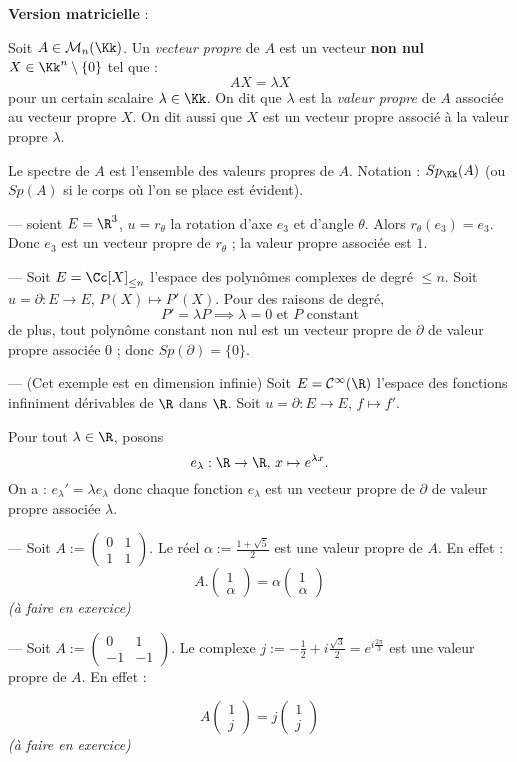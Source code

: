 \documentclass[class=report,crop=false]{standalone}
\newcommand{\exoo}{\emph{(à faire en exercice)}}
\newcommand{\Sp}{Sp}
\begin{document}
{\bf Version matricielle} :

Soit $A \in \mathcal{M}_n(\Kk)$.  Un {\it vecteur propre} de $A$ est un vecteur {\bf non nul}  $X \in \Kk^n\setminus\{0\}$ tel que :
\[A X = \lambda X\]
pour un certain scalaire $\lambda \in \Kk$. On dit que $\lambda$ est la {\it valeur propre} de $A$ associée au vecteur propre $X$. On dit aussi que $X$ est un vecteur propre associé à la valeur propre $\lambda$.

Le spectre de $A$ est l'ensemble des valeurs propres de $A$. Notation : $\Sp_\Kk(A)$ (ou $\Sp(A)$ si le corps où l'on se place est évident). 

\vskip 1cm
\begin{exemple}[s]

--- soient $E= \R^3$, $u=r_\theta$ la rotation d'axe $e_3$ et d'angle $\theta$. Alors $r_\theta(e_3)=e_3$. Donc $e_3$ est un vecteur propre de $r_\theta$ ; la valeur propre associée est $1$.

--- Soit $E=\Cc[X]_{\le n}$ l'espace des polynômes complexes de degré $\le n$. Soit $u=\partial : E \to E$, $P(X) \mapsto P'(X)$. Pour des raisons de degré, \[P' =\lambda P \implies \lambda =0 \text{ et } P \mbox{ constant}\]
de plus, tout polynôme constant non nul est un vecteur propre de $\partial$ de valeur propre associée $0$ ; donc $\Sp(\partial) = \{0\}$.

--- (Cet exemple est en dimension infinie) Soit $E =\mathcal{C}^\infty(\R)$ l'espace des fonctions infiniment dérivables de $\R$ dans $\R$. Soit $u =\partial 
 : E \to E$, $f \mapsto f'$.

Pour tout $\lambda \in \R$, posons \[e_\lambda : \R \to \R ,\, x \mapsto e^{\lambda x}.\]
On a : $e_\lambda' = \lambda e_\lambda$ donc chaque fonction $e_\lambda$ est un vecteur propre de $\partial$ de valeur propre associée $\lambda$.

--- Soit $A := \left(\begin{array}{cc}
0 & 1\\
1 &1
\end{array}\right)$. Le réel $\alpha :=\frac{1+\sqrt{5}}{2}$ est une valeur propre de $A$. En effet :
\[A.\left(\begin{array}{c}
1\\
\alpha
\end{array}\right) = \alpha \left(\begin{array}{c}
1\\
\alpha
\end{array}\right)\]
\exoo

--- Soit $A := \left(\begin{array}{cc}
0 & 1\\
-1 &-1
\end{array}\right)$. Le complexe $j :=-\frac{1}{2} + i \frac{\sqrt{3}}{2} = e^{i\frac{2\pi}{3}}$ est une valeur propre de $A$. En effet :

\[A \left(\begin{array}{c}
1\\
j
\end{array}\right) = j \left(\begin{array}{c}
1\\
j
\end{array}\right)\]
\exoo
 \end{exemple}
\end{document}
